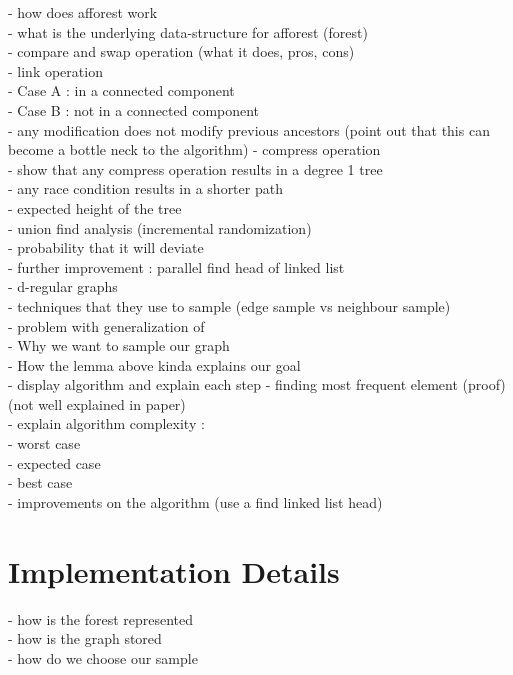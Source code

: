 \documentclass[]{article}
\begin{document}
 - how does afforest work\\
 - what is the underlying data-structure for afforest (forest)\\
 - compare and swap operation (what it does, pros, cons)\\
 - link operation\\
 - Case A : in a connected component\\
 - Case B : not in a connected component\\
 - any modification does not modify previous ancestors (point out that this can\\ become a bottle neck to the algorithm)
 - compress operation\\
 - show that any compress operation results in a degree 1 tree\\
 - any race condition results in a shorter path\\
 - expected height of the tree\\
 - union find analysis (incremental randomization) \\
 - probability that it will deviate \\
 - further improvement : parallel find head of linked list\\
 - d-regular graphs\\
 - techniques that they use to sample (edge sample vs neighbour sample)\\
 - problem with generalization of\\
 - Why we want to sample our graph\\
 - How the lemma above kinda explains our goal\\
 - display algorithm and explain each step
 - finding most frequent element (proof) (not well explained in paper)\\
 - explain algorithm complexity :\\
    - worst case\\
    - expected case\\
    - best case\\
- improvements on the algorithm (use a find linked list head)\\
 
 
 
 \section*{Implementation Details}
 - how is the forest represented\\
 - how is the graph stored\\
 - how do we choose our sample\\
 
\end{document}
